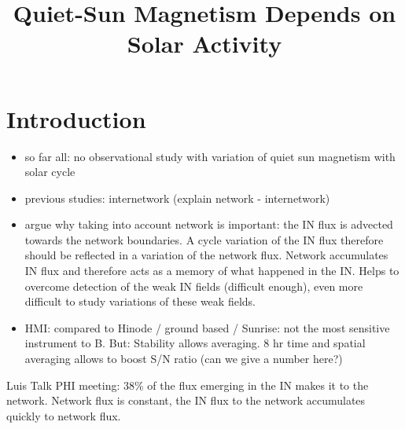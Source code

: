\documentclass{aa}
\begin{document}
\title{Quiet-Sun Magnetism Depends on Solar Activity}






\maketitle

\section{Introduction} \label{sec:intro}

\begin{itemize}
\item so far all: no observational study with variation of quiet sun magnetism with solar cycle
\item previous studies: internetwork (explain network - internetwork)
\item argue why taking into account network is important: the IN flux is advected towards the network boundaries. A cycle variation of the IN flux therefore should be reflected in a variation of the network flux. Network accumulates IN flux and therefore acts as a memory of what happened in the IN. Helps to overcome detection of the weak IN fields (difficult enough), even more difficult to study variations of these weak fields.
\item HMI: compared to Hinode / ground based / Sunrise: not the most sensitive instrument to B. But: Stability allows averaging. 8 hr time and spatial averaging allows to boost S/N ratio (can we give a number here?)

\end{itemize}

\cite[]{2019LRSP...16....1B}
Luis Talk PHI meeting: 38\% of the flux emerging in the IN makes it to the network. Network flux is constant, the IN flux to the network accumulates quickly to network flux.
\end{document}
